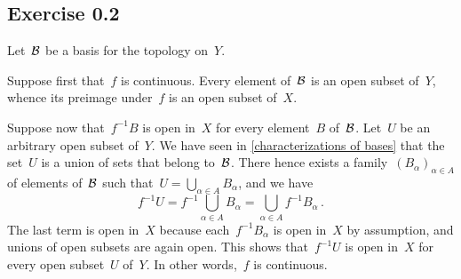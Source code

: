 \subsection{Exercise 0.2}

Let~$\mathcal{B}$ be a basis for the topology on~$Y$.

Suppose first that~$f$ is continuous.
Every element of~$\mathcal{B}$ is an open subset of~$Y$, whence its preimage under~$f$ is an open subset of~$X$.

Suppose now that~$f^{-1} B$ is open in~$X$ for every element~$B$ of~$\mathcal{B}$.
Let~$U$ be an arbitrary open subset of~$Y$.
We have seen in \cref{characterizations of bases} that the set~$U$ is a union of sets that belong to~$\mathcal{B}$.
There hence exists a family~$(B_α)_{α ∈ A}$ of elements of~$\mathcal{B}$ such that~$U = ⋃_{α ∈ A} B_α$, and we have
\[
	f^{-1} U
	=
	f^{-1} ⋃_{α ∈ A} B_α
	=
	⋃_{α ∈ A} f^{-1} B_α \,.
\]
The last term is open in~$X$ because each~$f^{-1} B_α$ is open in~$X$ by assumption, and unions of open subsets are again open.
This shows that~$f^{-1} U$ is open in~$X$ for every open subset~$U$ of~$Y$.
In other words,~$f$ is continuous.
